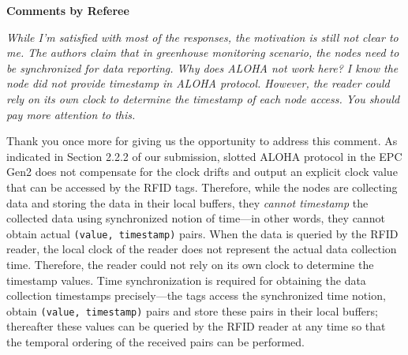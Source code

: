 \documentclass[10pt]{article}
\newcommand{\referee}[1]{
	{\item \color{OliveGreen} \emph{{#1}}}
	\label{R\therefereeCounter:\arabic{enumi}}
}
\newcommand{\response}[1]{{\color{blue} #1}}
\newcounter{refereeCounter}
\newenvironment{responses}{%
\refstepcounter{refereeCounter}%
\textbf{\large Comments by Referee \therefereeCounter}
\begin{enumerate}%
\renewcommand{\labelenumi}{\textbf{[R\therefereeCounter :\,\arabic{enumi}]}} %
}{\end{enumerate}}
\begin{document}
\begin{responses}

\referee{While I'm satisfied with most of the responses, the motivation is still not clear to me. The authors claim that in greenhouse monitoring scenario, the nodes need to be synchronized for data reporting. Why does ALOHA not work here? I know the node did not provide timestamp in ALOHA protocol. However, the reader could rely on its own clock to determine the timestamp of each node access. You should pay more attention to this.}
	
\response{Thank you once more for giving us the opportunity to address this comment. As indicated in Section 2.2.2 of our submission, slotted ALOHA protocol in the EPC Gen2 does not compensate for the clock drifts and output an explicit clock value that can be accessed by the RFID tags. Therefore, while the nodes are collecting data and storing the data in their local buffers, they \emph{cannot timestamp} the collected data using synchronized notion of time---in other words, they cannot obtain actual \texttt{(value, timestamp)} pairs. When the data is queried by the RFID reader, the local clock of the reader does not represent the actual data collection time. Therefore, the reader could not rely on its own clock to determine the timestamp values. Time synchronization is required for obtaining the data collection timestamps precisely---the tags access the synchronized time notion, obtain \texttt{(value, timestamp)} pairs and store these pairs in their local buffers; thereafter these values can be queried by the RFID reader at any time so that the temporal ordering of the received pairs can be performed. }

\end{responses}
\end{document}
